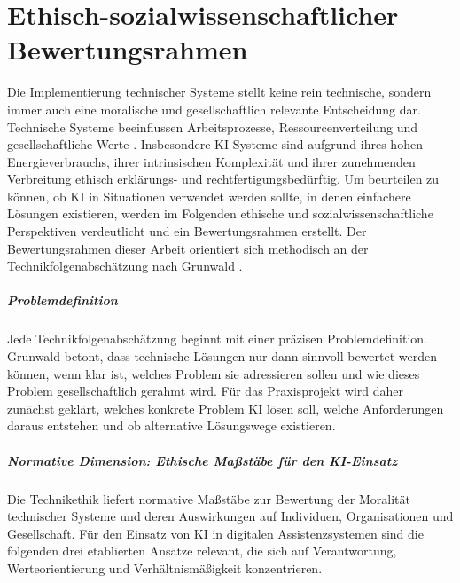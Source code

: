 \chapter{Ethisch-sozialwissenschaftlicher Bewertungsrahmen}
\label{chap:ethischeperspektiven}

Die Implementierung technischer Systeme stellt keine rein technische, sondern immer auch eine moralische und gesellschaftlich relevante Entscheidung dar. Technische Systeme beeinflussen Arbeitsprozesse, Ressourcenverteilung und gesellschaftliche Werte \cite{grunwaldTechnikfolgenabschaetzungEinfuehrung2025}. Insbesondere KI-Systeme sind aufgrund ihres hohen Energieverbrauchs, ihrer intrinsischen Komplexität und ihrer zunehmenden Verbreitung ethisch erklärungs- und rechtfertigungsbedürftig. Um beurteilen zu können, ob KI in Situationen verwendet werden sollte, in denen einfachere Lösungen existieren, werden im Folgenden ethische und sozialwissenschaftliche Perspektiven verdeutlicht und ein Bewertungsrahmen erstellt. Der Bewertungsrahmen dieser Arbeit orientiert sich methodisch an der Technikfolgenabschätzung nach Grunwald \cite{grunwaldTechnikfolgenabschaetzungEinfuehrung2025}.

\paragraph{Problemdefinition}

Jede Technikfolgenabschätzung beginnt mit einer präzisen Problemdefinition. Grunwald betont, dass technische Lösungen nur dann sinnvoll bewertet werden können, wenn klar ist, welches Problem sie adressieren sollen und wie dieses Problem gesellschaftlich gerahmt wird. Für das Praxisprojekt wird daher zunächst geklärt, welches konkrete Problem KI lösen soll, welche Anforderungen daraus entstehen und ob alternative Lösungswege existieren.

\paragraph{Normative Dimension: Ethische Maßstäbe für den KI-Einsatz}

Die Technikethik liefert normative Maßstäbe zur Bewertung der Moralität technischer Systeme und deren Auswirkungen auf Individuen, Organisationen und Gesellschaft. Für den Einsatz von KI in digitalen Assistenzsystemen sind die folgenden drei etablierten Ansätze relevant, die sich auf Verantwortung, Werteorientierung und Verhältnismäßigkeit konzentrieren.

